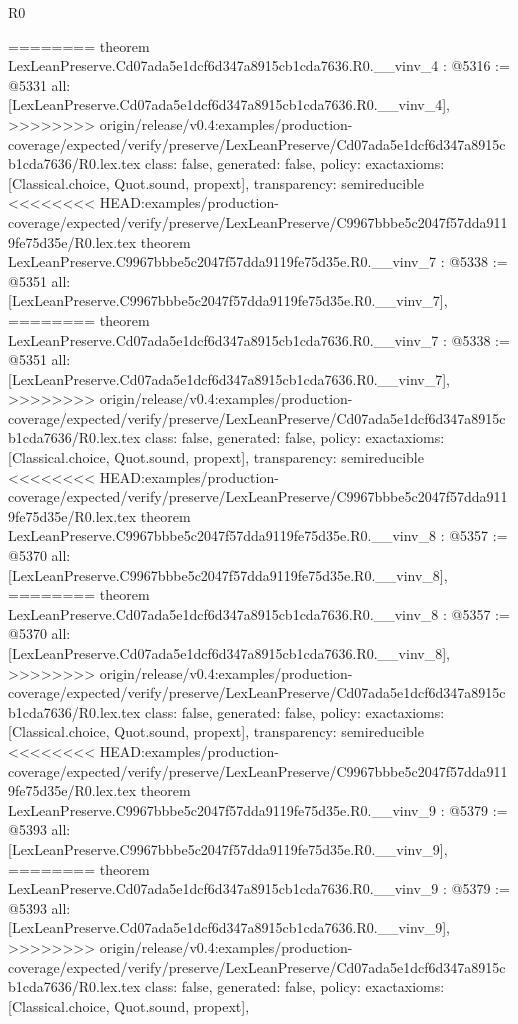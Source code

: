 \begin{lexlean}{R0}
\begin{coremodule}
{{{{{{{{{{{{{{{{{{{{{{{{{{{{{{{{{{{{{{{{{{{{{{{{{{{{{{{{{{{{{{{{{{{{{{{{{{========
theorem LexLeanPreserve.Cd07ada5e1dcf6d347a8915cb1cda7636.R0.__vinv_4 : @5316 := @5331 {
  all: [LexLeanPreserve.Cd07ada5e1dcf6d347a8915cb1cda7636.R0.__vinv_4],
>>>>>>>> origin/release/v0.4:examples/production-coverage/expected/verify/preserve/LexLeanPreserve/Cd07ada5e1dcf6d347a8915cb1cda7636/R0.lex.tex
  class: false,
  generated: false,
  policy: exact{axioms: [Classical.choice, Quot.sound, propext]},
  transparency: semireducible
}
<<<<<<<< HEAD:examples/production-coverage/expected/verify/preserve/LexLeanPreserve/C9967bbbe5c2047f57dda9119fe75d35e/R0.lex.tex
theorem LexLeanPreserve.C9967bbbe5c2047f57dda9119fe75d35e.R0.__vinv_7 : @5338 := @5351 {
  all: [LexLeanPreserve.C9967bbbe5c2047f57dda9119fe75d35e.R0.__vinv_7],
========
theorem LexLeanPreserve.Cd07ada5e1dcf6d347a8915cb1cda7636.R0.__vinv_7 : @5338 := @5351 {
  all: [LexLeanPreserve.Cd07ada5e1dcf6d347a8915cb1cda7636.R0.__vinv_7],
>>>>>>>> origin/release/v0.4:examples/production-coverage/expected/verify/preserve/LexLeanPreserve/Cd07ada5e1dcf6d347a8915cb1cda7636/R0.lex.tex
  class: false,
  generated: false,
  policy: exact{axioms: [Classical.choice, Quot.sound, propext]},
  transparency: semireducible
}
<<<<<<<< HEAD:examples/production-coverage/expected/verify/preserve/LexLeanPreserve/C9967bbbe5c2047f57dda9119fe75d35e/R0.lex.tex
theorem LexLeanPreserve.C9967bbbe5c2047f57dda9119fe75d35e.R0.__vinv_8 : @5357 := @5370 {
  all: [LexLeanPreserve.C9967bbbe5c2047f57dda9119fe75d35e.R0.__vinv_8],
========
theorem LexLeanPreserve.Cd07ada5e1dcf6d347a8915cb1cda7636.R0.__vinv_8 : @5357 := @5370 {
  all: [LexLeanPreserve.Cd07ada5e1dcf6d347a8915cb1cda7636.R0.__vinv_8],
>>>>>>>> origin/release/v0.4:examples/production-coverage/expected/verify/preserve/LexLeanPreserve/Cd07ada5e1dcf6d347a8915cb1cda7636/R0.lex.tex
  class: false,
  generated: false,
  policy: exact{axioms: [Classical.choice, Quot.sound, propext]},
  transparency: semireducible
}
<<<<<<<< HEAD:examples/production-coverage/expected/verify/preserve/LexLeanPreserve/C9967bbbe5c2047f57dda9119fe75d35e/R0.lex.tex
theorem LexLeanPreserve.C9967bbbe5c2047f57dda9119fe75d35e.R0.__vinv_9 : @5379 := @5393 {
  all: [LexLeanPreserve.C9967bbbe5c2047f57dda9119fe75d35e.R0.__vinv_9],
========
theorem LexLeanPreserve.Cd07ada5e1dcf6d347a8915cb1cda7636.R0.__vinv_9 : @5379 := @5393 {
  all: [LexLeanPreserve.Cd07ada5e1dcf6d347a8915cb1cda7636.R0.__vinv_9],
>>>>>>>> origin/release/v0.4:examples/production-coverage/expected/verify/preserve/LexLeanPreserve/Cd07ada5e1dcf6d347a8915cb1cda7636/R0.lex.tex
  class: false,
  generated: false,
  policy: exact{axioms: [Classical.choice, Quot.sound, propext]},
}}}}}}}}}}}}}}}}}}}}}}}}}}}}}}}}}}}}}}}}}}}}}}}}}}}}}}}}}}}}}}}}}}}}}}}}}}}}}}
\end{coremodule}
\end{lexlean}
